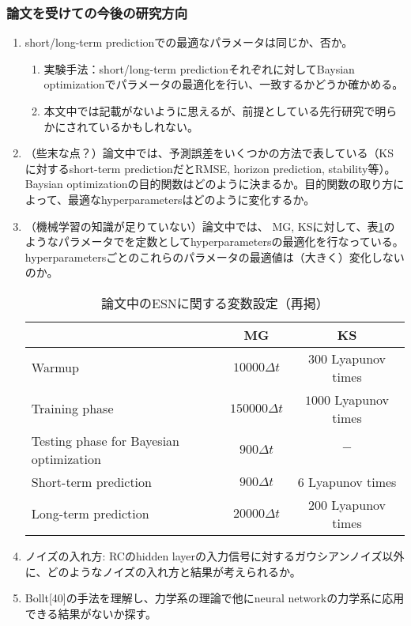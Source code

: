 \subsubsection{論文を受けての今後の研究方向}
\begin{enumerate}
  \item short/long-term predictionでの最適なパラメータは同じか、否か。\begin{enumerate}
    \item 実験手法：short/long-term predictionそれぞれに対してBaysian optimizationでパラメータの最適化を行い、一致するかどうか確かめる。
    \item 本文中では記載がないように思えるが、前提としている先行研究で明らかにされているかもしれない。
  \end{enumerate}
  \item （些末な点？）論文中では、予測誤差をいくつかの方法で表している（KSに対するshort-term predictionだとRMSE, horizon prediction, stability等）。Baysian optimizationの目的関数はどのように決まるか。目的関数の取り方によって、最適なhyperparametersはどのように変化するか。
  \item （機械学習の知識が足りていない）論文中では、
  MG, KSに対して、表\ref{tab:ESN_parameters_inpaper(again)}のようなパラメータでを定数としてhyperparametersの最適化を行なっている。
  hyperparametersごとのこれらのパラメータの最適値は（大きく）変化しないのか。
  \begin{table}[h!]
    \centering
    \begin{tabular}{lcc}
        \toprule
        & MG & KS \\
        \midrule
        Warmup & $10000\Delta t$ & $300$ Lyapunov times \\
        Training phase & $150000\Delta t$ & $1000$ Lyapunov times \\
        Testing phase for Bayesian optimization & $900\Delta t$ & $-$ \\
        Short-term prediction & $900\Delta t$ & $6$ Lyapunov times \\
        Long-term prediction & $20000\Delta t$ & $200$ Lyapunov times \\
        \bottomrule
    \end{tabular}
    \caption{論文中のESNに関する変数設定（再掲）}
    \label{tab:ESN_parameters_inpaper(again)}
\end{table}
\item ノイズの入れ方: RCのhidden layerの入力信号に対するガウシアンノイズ以外に、どのようなノイズの入れ方と結果が考えられるか。
\item Bollt[40]の手法を理解し、力学系の理論で他にneural networkの力学系に応用できる結果がないか探す。
\end{enumerate}

